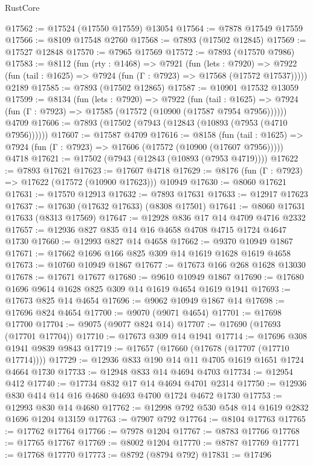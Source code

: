 \begin{lexlean}{RustCore}
\begin{coremodule}
@17562 := @17524 (@17550 @17559) @13054
@17564 := @7878 @17549 @17559
@17566 := @8109 @17548 @2760
@17568 := @7893 (@17502 @12845)
@17569 := @17527 @12848
@17570 := @7965 @17569
@17572 := @7893 (@17570 @7986)
@17583 := @8112
    (fun (rty : @1468) =>
    @7921
      (fun (lets : @7920) =>
      @7922 (fun (tail : @1625) => @7924 (fun (Γ : @7923) => @17568 (@17572 @17537)))))
    @2189
@17585 := @7893 (@17502 @12865)
@17587 := @10901 @17532 @13059
@17599 := @8134
    (fun (lets : @7920) =>
    @7922
      (fun (tail : @1625) =>
      @7924 (fun (Γ : @7923) => @17585 (@17572 (@10900 (@17587 @7954 @7956))))))
    @4709
@17606 := @7893 (@17502 (@7943 (@12843 (@10893 (@7953 (@4710 @7956))))))
@17607 := @17587 @4709
@17616 := @8158
    (fun (tail : @1625) => @7924 (fun (Γ : @7923) => @17606 (@17572 (@10900 (@17607 @7956)))))
    @4718
@17621 := @17502 (@7943 (@12843 (@10893 (@7953 @4719))))
@17622 := @7893 @17621
@17623 := @17607 @4718
@17629 := @8176 (fun (Γ : @7923) => @17622 (@17572 (@10900 @17623))) @10949
@17630 := @8060 @17621
@17631 := @17570 @12913
@17632 := @7893 @17631
@17633 := @12917 @17623
@17637 := @17630 (@17632 @17633) (@8308 @17501)
@17641 := @8060 @17631 @17633 (@8313 @17569)
@17647 := @12928 @836 @17 @14 @4709 @4716 @2332
@17657 := @12936 @827 @835 @14 @16 @4658 @4708 @4715 @1724 @4647 @1730
@17660 := @12993 @827 @14 @4658
@17662 := @9370 @10949 @1867
@17671 := @17662 @1696 @166 @825 @309 @14 @1619 @1628 @1619 @4658
@17673 := @10760 @10949 @1867
@17677 := @17673 @166 @268 @1628 @13030
@17678 := @17671 @17677
@17680 := @9610 @10949 @1867
@17690 := @17680 @1696 @9614 @1628 @825 @309 @14 @1619 @4654 @1619 @1941
@17693 := @17673 @825 @14 @4654
@17696 := @9062 @10949 @1867 @14
@17698 := @17696 @824 @4654
@17700 := @9070 (@9071 @4654)
@17701 := @17698 @17700
@17704 := @9075 (@9077 @824 @14)
@17707 := @17690 (@17693 (@17701 @17704))
@17710 := @17673 @309 @14 @1941
@17714 := @17696 @308 @1941 @9839 @9843
@17719 := @17657 (@17660 (@17678 (@17707 (@17710 @17714))))
@17729 := @12936 @833 @190 @14 @11 @4705 @1619 @1651 @1724 @4664 @1730
@17733 := @12948 @833 @14 @4694 @4703
@17734 := @12954 @412
@17740 := @17734 @832 @17 @14 @4694 @4701 @2314
@17750 := @12936 @830 @414 @14 @16 @4680 @4693 @4700 @1724 @4672 @1730
@17753 := @12993 @830 @14 @4680
@17762 := @12998 @792 @530 @548 @14 @1619 @2832 @1696 @1204 @13159
@17763 := @7907 @792
@17764 := @8104 @17763
@17765 := @17762 @17764
@17766 := @7978 @1204
@17767 := @8783 @17766
@17768 := @17765 @17767
@17769 := @8002 @1204
@17770 := @8787 @17769
@17771 := @17768 @17770
@17773 := @8792 (@8794 @792)
@17831 := @17496

\end{coremodule}
\end{lexlean}

